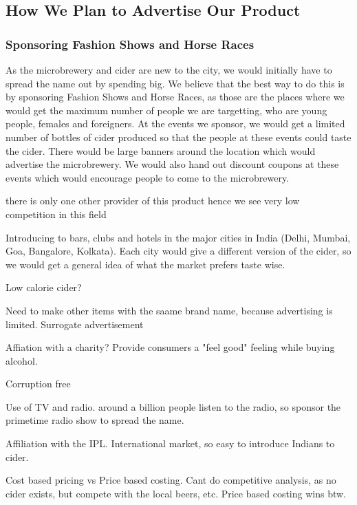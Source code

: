 \documentclass{article}
\begin{document}
\subsection{How We Plan to Advertise Our Product}
\subsubsection{Sponsoring Fashion Shows and Horse Races}
As the microbrewery and cider are new to the city, we would initially have to 
spread the name out by spending big. We believe that the best way to do this is
by sponsoring Fashion Shows and Horse Races, as those are the places where we would
get the maximum number of people we are targetting, who are young people, females
and foreigners.
At the events we sponsor, we would get a limited number of bottles of cider produced
so that the people at these events could taste the cider. There would be large banners
around the location which would advertise the microbrewery. We would also hand out
discount coupons at these events which would encourage people to come to the 
microbrewery. 
\newpage


there is only one other provider of this product hence we see very low competition in this field 

Introducing to bars, clubs and hotels in the major cities in India (Delhi, Mumbai, Goa,
Bangalore, Kolkata). Each city would give a different version of the cider, so we would
get a general idea of what the market prefers taste wise.

Low calorie cider?

Need to make other items with the saame brand name, because advertising is limited. Surrogate advertisement

Affiation with a charity? Provide consumers a "feel good" feeling while buying alcohol.

Corruption free

Use of TV and radio. around a billion people listen to the radio, so sponsor the primetime radio
show to spread the name.

Affiliation with the IPL. International market, so easy to introduce Indians to cider.

Cost based pricing vs Price based costing. Cant do competitive analysis, as no cider exists, but compete with
the local beers, etc. Price based costing wins btw.


\end{document}
